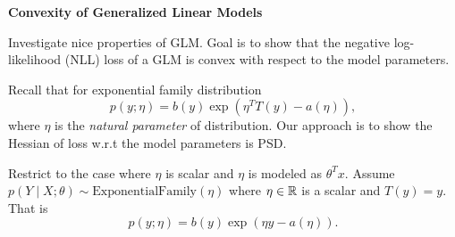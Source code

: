 \documentclass[12pt,letterpaper,boxed]{hmcpset}
\begin{document}
\begin{problem}[Problem 4]
  \textbf{Convexity of Generalized Linear Models} 
  
  Investigate nice properties of GLM. Goal is to show that the negative log-likelihood (NLL) loss of a GLM is convex with respect to the model parameters.

  Recall that for exponential family distribution
  \[
  p(y ; \eta) = b(y) \exp(\eta^T T(y) - a(\eta)),
  \]
  where $\eta$ is the \emph{natural parameter} of distribution. Our approach is to show the Hessian of loss w.r.t the model parameters is PSD.

  Restrict to the case where $\eta$ is scalar and $\eta$ is modeled as $\theta^T x$. Assume $p(Y \mid X ; \theta) \sim \text{ExponentialFamily}(\eta)$ where $\eta \in \mathbb{R}$ is a scalar and $T(y) = y$. That is
  \[
  p(y ; \eta) = b(y) \exp(\eta y - a(\eta)).
  \]
\end{problem}
\end{document}
